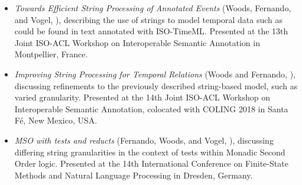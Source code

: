 \documentclass[a4paper,12pt,leqno,twoside]{article}
\begin{document}
\begin{itemize}
	\item \textit{Towards Efficient String Processing of Annotated Events} (Woods, Fernando, and Vogel, \citeyear{woods2017towards}), describing the use of strings to model temporal data such as could be found in text annotated with ISO-TimeML. Presented at the 13th Joint ISO-ACL Workshop on Interoperable Semantic Annotation in Montpellier, France.
	\item \textit{Improving String Processing for Temporal Relations} (Woods and Fernando, \citeyear{woods2018improving}), discussing refinements to the previously described string-based model, such as varied granularity. Presented at the 14th Joint ISO-ACL Workshop on Interoperable Semantic Annotation, colocated with COLING 2018 in Santa F\'{e}, New Mexico, USA.
	\item \textit{MSO with tests and reducts} (Fernando, Woods, and Vogel, \citeyear{fernando2019mso}), discussing differing string granularities in the context of tests within Monadic Second Order logic. Presented at the 14th International Conference on Finite-State Methods and Natural Language Processing in Dresden, Germany.
\end{itemize}
\newpage
{}
\tableofcontents
\newpage
\listoffigures
\listoftables
\newpage
{}
\end{document}
